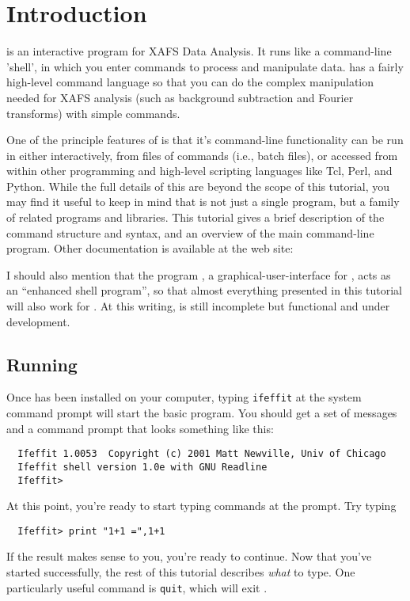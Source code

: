 \documentclass[11pt]{article}
\begin{document}



\section{Introduction}\label{s:intro}

{\ifeffit} is an interactive program for XAFS Data Analysis.  It runs like
a command-line 'shell', in which you enter commands to process and
manipulate data.  {\ifeffit} has a fairly high-level command language so
that you can do the complex manipulation needed for XAFS analysis (such as
background subtraction and Fourier transforms) with simple commands.

One of the principle features of {\ifeffit} is that it's command-line
functionality can be run in either interactively, from files of commands
(i.e., batch files), or accessed from within other programming and
high-level scripting languages like Tcl, Perl, and Python.  While the full
details of this are beyond the scope of this tutorial, you may find it
useful to keep in mind that {\ifeffit} is not just a single program, but a
family of related programs and libraries.  This tutorial gives a brief
description of the {\ifeffit} command structure and syntax, and an overview
of the main {\ifeffit} command-line program.  Other documentation is
available at the {\ifeffit} web site: {\WWWiff}

I should also mention that the program {\gifeffit}, a
graphical-user-interface for {\ifeffit}, acts as an ``enhanced shell
program'', so that almost everything presented in this tutorial will also
work for {\gifeffit}.  At this writing, {\gifeffit} is still incomplete but
functional and under development.


\subsection{Running {\ifeffit}}
\label{s:running}

Once {\ifeffit} has been installed on your computer, typing {\tt{ifeffit}}
at the system command prompt will start the basic {\ifeffit} program.  You
should get a set of messages and a command prompt that looks something like
this:
{\small\begin{verbatim}
  Ifeffit 1.0053  Copyright (c) 2001 Matt Newville, Univ of Chicago
  Ifeffit shell version 1.0e with GNU Readline
  Ifeffit>
\end{verbatim}}\noindent
At this point, you're ready to start typing {\ifeffit} commands at the
prompt. Try typing
{\small\begin{verbatim}
  Ifeffit> print "1+1 =",1+1
\end{verbatim}}\noindent
If the result makes sense to you, you're ready to continue.  Now that
you've started {\ifeffit} successfully, the rest of this tutorial
describes {\emph{what}} to type.  One particularly useful {\ifeffit}
command is {\tt{quit}}, which will exit {\ifeffit}.
\end{document}
